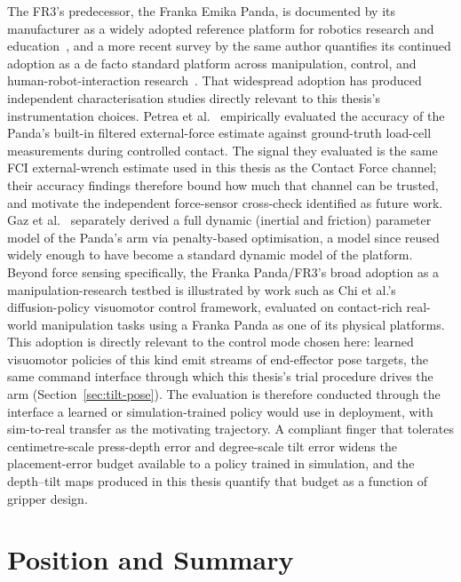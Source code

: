 The FR3's predecessor, the Franka Emika Panda, is documented by its
manufacturer as a widely adopted reference platform for robotics research
and education~\cite{haddadin2022franka}, and a more recent survey by the
same author quantifies its continued adoption as a de facto standard
platform across manipulation, control, and human-robot-interaction
research~\cite{haddadin2024standard}. That widespread adoption has
produced independent characterisation studies directly relevant to this
thesis's instrumentation choices. Petrea et
al.~\cite{petrea2021interaction} empirically evaluated the accuracy of the
Panda's built-in filtered external-force estimate against ground-truth
load-cell measurements during controlled contact. The signal they
evaluated is the same FCI external-wrench estimate used in this thesis
as the Contact Force channel; their accuracy findings therefore bound
how much that channel can be trusted, and motivate the independent
force-sensor cross-check identified as future work.
Gaz et al.~\cite{gaz2019dynamic} separately derived a full dynamic
(inertial and friction) parameter model of the Panda's arm via
penalty-based optimisation, a model since reused widely enough to have
become a standard dynamic model of the platform. Beyond force
sensing specifically, the Franka Panda/FR3's broad adoption as a
manipulation-research testbed is illustrated by work such as Chi et
al.'s~\cite{chi2023diffusion} diffusion-policy visuomotor control
framework, evaluated on contact-rich real-world manipulation tasks using a
Franka Panda as one of its physical platforms. This adoption is directly
relevant to the control mode chosen here: learned visuomotor policies of
this kind emit streams of end-effector pose targets, the same command
interface through which this thesis's trial procedure drives the arm
(Section~\ref{sec:tilt-pose}). The evaluation is therefore conducted
through the interface a learned or simulation-trained policy would use in
deployment, with sim-to-real transfer as the motivating trajectory. A
compliant finger that tolerates centimetre-scale press-depth error and
degree-scale tilt error widens the placement-error budget available to a
policy trained in simulation, and the depth--tilt maps produced in this
thesis quantify that budget as a function of gripper design.

\section{Position and Summary}

